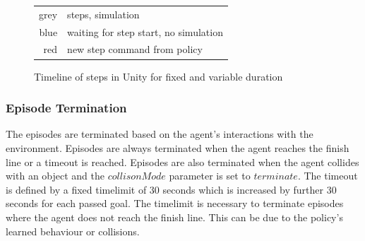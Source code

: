\begin{figure}[!ht]
\begin{tabular}{r@{: }l}
    grey & steps, simulation \\
    blue & waiting for step start, no simulation \\ 
    red & new step command from policy
\end{tabular}
\caption{Timeline of steps in Unity for fixed and variable duration}
\label{fig:unity_timeline_steps_duration}
\end{figure}




\subsubsection{Episode Termination}
\label{time_limit}The episodes are terminated based on the agent's interactions with the environment. Episodes are always terminated when the agent reaches the finish line or a timeout is reached. Episodes are also terminated when the agent collides with an object and the $collisonMode$ parameter is set to $terminate$.
The timeout is defined by a fixed timelimit of 30 seconds which is increased by further 30 seconds for each passed goal. The timelimit is necessary to terminate episodes where the agent does not reach the finish line. This can be due to the policy's learned behaviour or collisions. 

